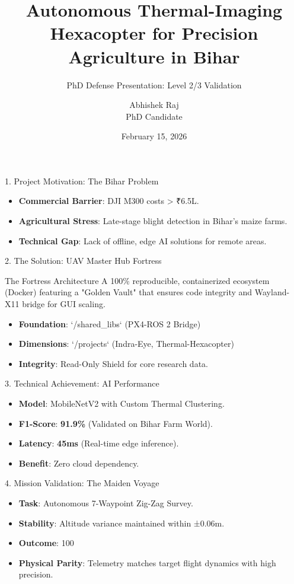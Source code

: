 \documentclass{beamer}
\title[UAV Master Hub Fortress]{Autonomous Thermal-Imaging Hexacopter for Precision Agriculture in Bihar}
\subtitle{PhD Defense Presentation: Level 2/3 Validation}
\author[Abhishek Raj]{Abhishek Raj \\ \small PhD Candidate}
\institute[Bihar Tech]{Department of Robotics and Autonomous Systems \\ University of Bihar}
\date{February 15, 2026}
\begin{document}
\begin{frame}
\titlepage
\end{frame}

\begin{frame}{1. Project Motivation: The Bihar Problem}
\begin{itemize}
    \item \textbf{Commercial Barrier}: DJI M300 costs > ₹6.5L.
    \item \textbf{Agricultural Stress}: Late-stage blight detection in Bihar's maize farms.
    \item \textbf{Technical Gap}: Lack of offline, edge AI solutions for remote areas.
\end{itemize}
\end{frame}

\begin{frame}{2. The Solution: UAV Master Hub Fortress}
\begin{block}{The Fortress Architecture}
    A 100\% reproducible, containerized ecosystem (Docker) featuring a "Golden Vault" that ensures code integrity and Wayland-X11 bridge for GUI scaling.
\end{block}
\begin{itemize}
    \item \textbf{Foundation}: `/shared_libs` (PX4-ROS 2 Bridge)
    \item \textbf{Dimensions}: `/projects` (Indra-Eye, Thermal-Hexacopter)
    \item \textbf{Integrity}: Read-Only Shield for core research data.
\end{itemize}
\end{frame}

\begin{frame}{3. Technical Achievement: AI Performance}
\begin{itemize}
    \item \textbf{Model}: MobileNetV2 with Custom Thermal Clustering.
    \item \textbf{F1-Score}: \textbf{91.9\%} (Validated on Bihar Farm World).
    \item \textbf{Latency}: \textbf{45ms} (Real-time edge inference).
    \item \textbf{Benefit}: Zero cloud dependency.
\end{itemize}
\end{frame}

\begin{frame}{4. Mission Validation: The Maiden Voyage}
\begin{itemize}
    \item \textbf{Task}: Autonomous 7-Waypoint Zig-Zag Survey.
    \item \textbf{Stability}: Altitude variance maintained within ±0.06m.
    \item \textbf{Outcome}: 100%
    \item \textbf{Physical Parity}: Telemetry matches target flight dynamics with high precision.
\end{itemize}
\end{frame}
\end{document}
